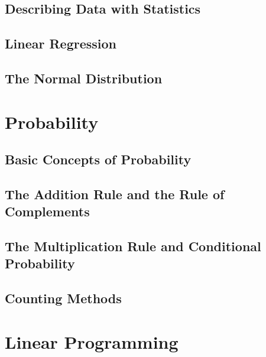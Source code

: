 \documentclass[9pt,letter,twoside,openright,fleqn]{memoir}
\begin{document}
\section{Describing Data with Statistics}

\pagebreak

\section{Linear Regression}


\section{The Normal Distribution}

\vfill
\pagebreak

\chapter{Probability}
\vfill
\pagebreak

\section{Basic Concepts of Probability}

\vfill
\pagebreak

\section{The Addition Rule and the Rule of Complements}

\pagebreak

\section{The Multiplication Rule and Conditional Probability}

\pagebreak

\section{Counting Methods}

\pagebreak

\chapter{Linear Programming}
\vfill
\pagebreak
\end{document}
